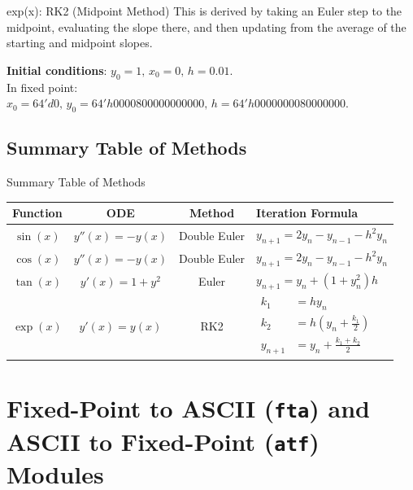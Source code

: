 \documentclass{beamer}
\theoremstyle{remark}
\begin{document}
\begin{frame}{exp(x): RK2 (Midpoint Method)}
This is derived by taking an Euler step to the midpoint, evaluating the slope there, and then updating from the average of the starting and midpoint slopes.

\textbf{Initial conditions}: \( y_0 = 1,\, x_0 = 0,\, h = 0.01 \). \\
In fixed point: \( x_0 = 64'd0,\, y_0 = 64'h0000800000000000,\, h = 64'h0000000080000000 \).
\end{frame}

\subsection*{Summary Table of Methods}
\begin{frame}{Summary Table of Methods}
\begin{table}[ht]
\centering
\begin{tabular}{|c|c|c|l|}
\hline
Function & ODE & Method & Iteration Formula \\
\hline
$\sin(x)$    & $y''(x) = -y(x)$  & Double Euler & $y_{n+1} = 2y_n - y_{n-1} - h^2 y_n$ \\
$\cos(x)$    & $y''(x) = -y(x)$  & Double Euler & $y_{n+1} = 2y_n - y_{n-1} - h^2 y_n$ \\
$\tan(x)$    & $y'(x) = 1+y^2$   & Euler        & $y_{n+1} = y_n + (1 + y_n^2) h$ \\
$\exp(x)$    & $y'(x) = y(x)$    & RK2          & $\begin{aligned}
k_1 &= h y_n \\
k_2 &= h (y_n + \frac{k_1}{2})\\
y_{n+1} &= y_n + \frac{k_1 + k_2}{2}
\end{aligned}$ \\
\hline
\end{tabular}
\end{table}
\end{frame}

\section{Fixed-Point to ASCII (\texttt{fta}) and ASCII to Fixed-Point (\texttt{atf}) Modules}
\end{document}
